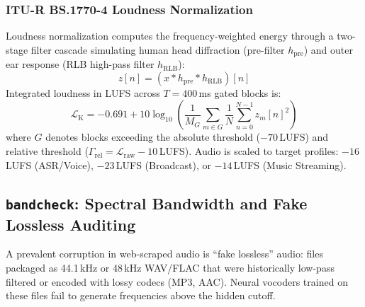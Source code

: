 \documentclass[10pt,journal,compsoc]{IEEEtran}
\begin{document}
\subsubsection{ITU-R BS.1770-4 Loudness Normalization}
Loudness normalization computes the frequency-weighted energy through a two-stage filter cascade simulating human head diffraction (pre-filter $h_{\text{pre}}$) and outer ear response (RLB high-pass filter $h_{\text{RLB}}$):
\begin{equation}
z[n] = (x * h_{\text{pre}} * h_{\text{RLB}})[n]
\label{eq:bs1770_filter}
\end{equation}
Integrated loudness in LUFS across $T = 400$\,ms gated blocks is:
\begin{equation}
\mathcal{L}_{\text{K}} = -0.691 + 10 \log_{10} \left( \frac{1}{M_G} \sum_{m \in G} \frac{1}{N} \sum_{n=0}^{N-1} z_m[n]^2 \right)
\label{eq:lufs}
\end{equation}
where $G$ denotes blocks exceeding the absolute threshold ($-70$\,LUFS) and relative threshold ($\Gamma_{\text{rel}} = \mathcal{L}_{\text{raw}} - 10$\,LUFS). Audio is scaled to target profiles: $-16$\,LUFS (ASR/Voice), $-23$\,LUFS (Broadcast), or $-14$\,LUFS (Music Streaming).

\subsection{\texttt{bandcheck}: Spectral Bandwidth and Fake Lossless Auditing}
A prevalent corruption in web-scraped audio is ``fake lossless'' audio: files packaged as 44.1\,kHz or 48\,kHz WAV/FLAC that were historically low-pass filtered or encoded with lossy codecs (MP3, AAC). Neural vocoders trained on these files fail to generate frequencies above the hidden cutoff.
\end{document}
